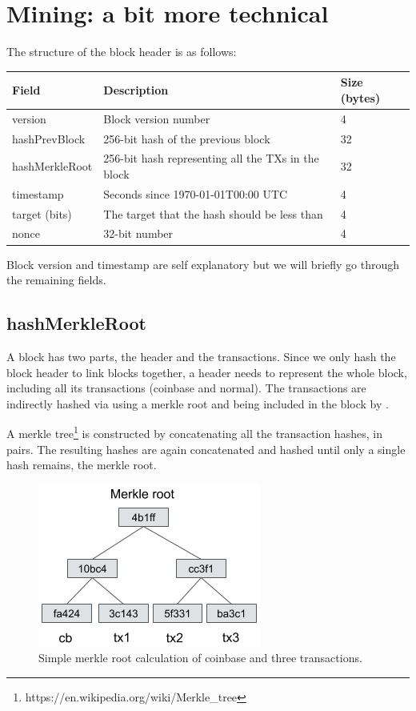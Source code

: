 \section{Mining: a bit more technical}
\label{sec:mining-technical}

The structure of the block header is as follows:

\begin{center}
\begin{tabular}{ |l|l|l| }
\hline
	Field & Description & Size (bytes)\\
\hline
	version        & Block version number                               & 4\\
	hashPrevBlock  & 256-bit hash of the previous block                 & 32\\
	hashMerkleRoot & 256-bit hash representing all the TXs in the block & 32\\
	timestamp      & Seconds since 1970-01-01T00:00 UTC                 & 4\\
	target (bits)  & The target that the hash should be less than       & 4\\
	nonce          & 32-bit number                                      & 4\\
\hline
\end{tabular}
\end{center}

Block version and timestamp are self explanatory but we will briefly go through the remaining fields.

\subsection*{hashMerkleRoot}
A block has two parts, the header and the transactions. Since we only hash the block header to link blocks together, a header needs to represent the whole block, including all its transactions (coinbase and normal). The transactions are indirectly hashed via using a merkle root and being included in the block by .

A merkle tree\footnote{https://en.wikipedia.org/wiki/Merkle\_tree} is constructed by concatenating all the transaction hashes, in pairs. The resulting hashes are again concatenated and hashed until only a single hash remains, the merkle root.

\begin{figure}[h]
\begin{center}
\includegraphics[scale=0.5]{images/merkle-tree}
\caption{Simple merkle root calculation of coinbase and three transactions.}
\label{fig:merkle-tree}
\end{center}
\end{figure}

